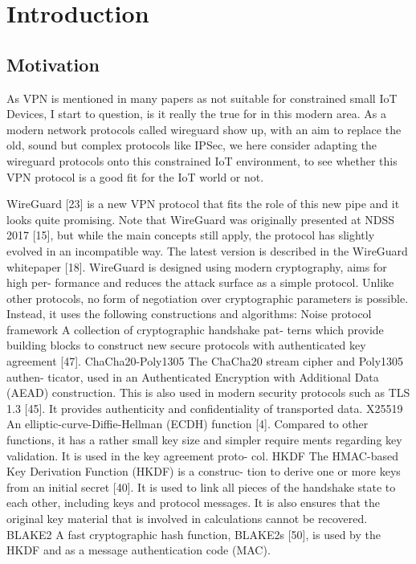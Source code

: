 \chapter{Introduction}
\section{Motivation}
  As VPN is mentioned in many papers as not suitable for constrained small IoT Devices, 
  I start to question, is it really the true for in this modern area. 
  As a modern network protocols called wireguard show up, with an aim to replace
  the old, sound but complex protocols like IPSec, we here consider adapting the wireguard
  protocols onto this constrained IoT environment, to see whether this VPN protocol is 
  a good fit for the IoT world or not.

  WireGuard [23] is a new VPN protocol that fits the role of this new pipe
and it looks quite promising. Note that WireGuard was originally presented
at NDSS 2017 [15], but while the main concepts still apply, the protocol has
slightly evolved in an incompatible way. The latest version is described in
the WireGuard whitepaper [18].
WireGuard is designed using modern cryptography, aims for high per-
formance and reduces the attack surface as a simple protocol. Unlike other
protocols, no form of negotiation over cryptographic parameters is possible.
Instead, it uses the following constructions and algorithms:
Noise protocol framework A collection of cryptographic handshake pat-
terns which provide building blocks to construct new secure protocols
with authenticated key agreement [47].
ChaCha20-Poly1305 The ChaCha20 stream cipher and Poly1305 authen-
ticator, used in an Authenticated Encryption with Additional Data
(AEAD) construction. This is also used in modern security protocols
such as TLS 1.3 [45]. It provides authenticity and confidentiality of
transported data.
X25519 An elliptic-curve-Diffie-Hellman (ECDH) function [4]. Compared
to other functions, it has a rather small key size and simpler require
ments regarding key validation. It is used in the key agreement proto-
col.
HKDF The HMAC-based Key Derivation Function (HKDF) is a construc-
tion to derive one or more keys from an initial secret [40]. It is used
to link all pieces of the handshake state to each other, including keys
and protocol messages. It is also ensures that the original key material
that is involved in calculations cannot be recovered.
BLAKE2 A fast cryptographic hash function, BLAKE2s [50], is used by
the HKDF and as a message authentication code (MAC).
